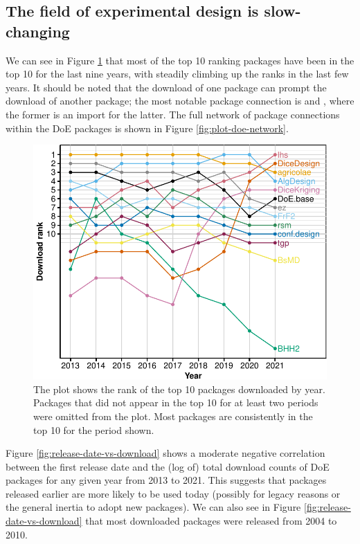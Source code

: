 \hypertarget{the-field-of-experimental-design-is-slow-changing}{%
\subsection{The field of experimental design is slow-changing}\label{the-field-of-experimental-design-is-slow-changing}}

We can see in Figure \ref{fig:rank-over-time} that most of the top 10 ranking packages have been in the top 10 for the last nine years, with  steadily climbing up the ranks in the last few years. It should be noted that the download of one package can prompt the download of another package; the most notable package connection is  and , where the former is an import for the latter. The full network of package connections within the DoE packages is shown in Figure \ref{fig:plot-doe-network}.

\begin{figure}[htbp]

{\centering \includegraphics{figures/rank-over-time-1} 

}

\caption{The plot shows the rank of the top 10 packages downloaded by year. Packages that did not appear in the top 10 for at least two periods were omitted from the plot. Most packages are consistently in the top 10 for the period shown.}\label{fig:rank-over-time}
\end{figure}

Figure \ref{fig:release-date-vs-download} shows a moderate negative correlation between the first release date and the (log of) total download counts of DoE packages for any given year from 2013 to 2021. This suggests that packages released earlier are more likely to be used today (possibly for legacy reasons or the general inertia to adopt new packages). We can also see in Figure \ref{fig:release-date-vs-download} that most downloaded packages were released from 2004 to 2010.

